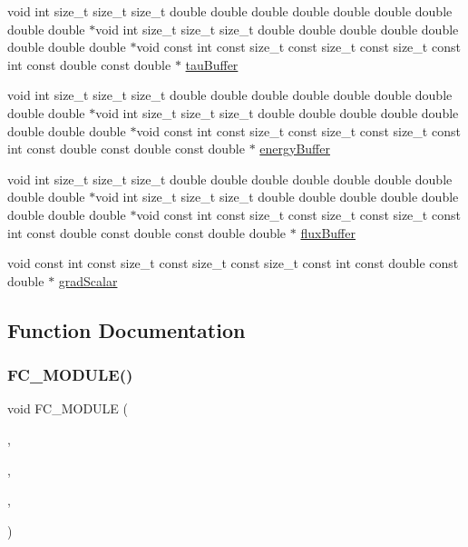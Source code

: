 \begin{DoxyCompactItemize}
\item 
void int size\+\_\+t size\+\_\+t size\+\_\+t double double double double double double double double double $\ast$void int size\+\_\+t size\+\_\+t size\+\_\+t double double double double double double double double $\ast$void const int const size\+\_\+t const size\+\_\+t const size\+\_\+t const int const double const double $\ast$ \hyperlink{ViscidKernels_8H_a4fefa736ee83a524669dc93b83a218df}{tau\+Buffer}
\item 
void int size\+\_\+t size\+\_\+t size\+\_\+t double double double double double double double double double $\ast$void int size\+\_\+t size\+\_\+t size\+\_\+t double double double double double double double double $\ast$void const int const size\+\_\+t const size\+\_\+t const size\+\_\+t const int const double const double const double $\ast$ \hyperlink{ViscidKernels_8H_a19a1cdfafabea8c3529fb1f5f0f12fcc}{energy\+Buffer}
\item 
void int size\+\_\+t size\+\_\+t size\+\_\+t double double double double double double double double double $\ast$void int size\+\_\+t size\+\_\+t size\+\_\+t double double double double double double double double $\ast$void const int const size\+\_\+t const size\+\_\+t const size\+\_\+t const int const double const double const double double $\ast$ \hyperlink{ViscidKernels_8H_abbdaff041c5151009f87fbae1b58e666}{flux\+Buffer}
\item 
void const int const size\+\_\+t const size\+\_\+t const size\+\_\+t const int const double const double $\ast$ \hyperlink{ViscidKernels_8H_a239db5332b411ca172b2f9bf4b0d92bf}{grad\+Scalar}
\end{DoxyCompactItemize}


\subsection{Function Documentation}
\hypertarget{ViscidKernels_8H_aaf2ad72ff290b2e910c220179f854b32}{}\label{ViscidKernels_8H_aaf2ad72ff290b2e910c220179f854b32} 
\subsubsection{\texorpdfstring{F\+C\+\_\+\+M\+O\+D\+U\+L\+E()}{FC\_MODULE()}\hspace{0.1cm}{\footnotesize\ttfamily [1/4]}}
{\footnotesize\ttfamily void F\+C\+\_\+\+M\+O\+D\+U\+LE (\begin{DoxyParamCaption}\item[{viscid}]{,  }\item[{viscidstresstensor}]{,  }\item[{V\+I\+S\+C\+ID}]{,  }\item[{V\+I\+S\+C\+I\+D\+S\+T\+R\+E\+S\+S\+T\+E\+N\+S\+OR}]{ }\end{DoxyParamCaption})}

